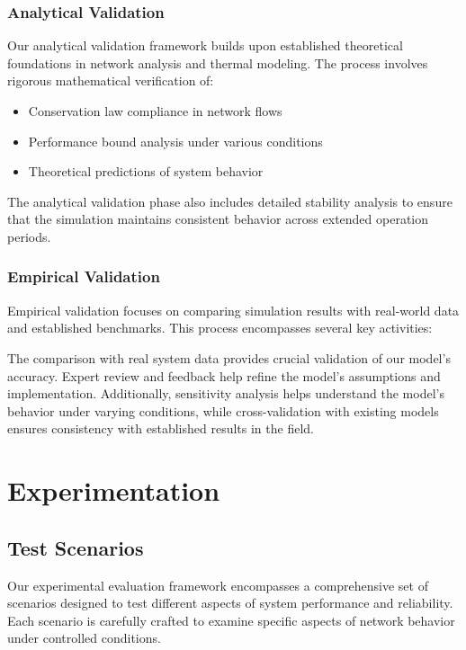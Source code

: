 \documentclass[12pt]{article}
\begin{document}
\subsubsection{Analytical Validation}
Our analytical validation framework builds upon established theoretical foundations in network analysis and thermal modeling. The process involves rigorous mathematical verification of:
\begin{itemize}[noitemsep]
    \item Conservation law compliance in network flows
    \item Performance bound analysis under various conditions
    \item Theoretical predictions of system behavior
\end{itemize}

The analytical validation phase also includes detailed stability analysis to ensure that the simulation maintains consistent behavior across extended operation periods.

\subsubsection{Empirical Validation}
Empirical validation focuses on comparing simulation results with real-world data and established benchmarks. This process encompasses several key activities:

The comparison with real system data provides crucial validation of our model's accuracy. Expert review and feedback help refine the model's assumptions and implementation. Additionally, sensitivity analysis helps understand the model's behavior under varying conditions, while cross-validation with existing models ensures consistency with established results in the field.

\section{Experimentation}
\subsection{Test Scenarios}
Our experimental evaluation framework encompasses a comprehensive set of scenarios designed to test different aspects of system performance and reliability. Each scenario is carefully crafted to examine specific aspects of network behavior under controlled conditions.
\end{document}
